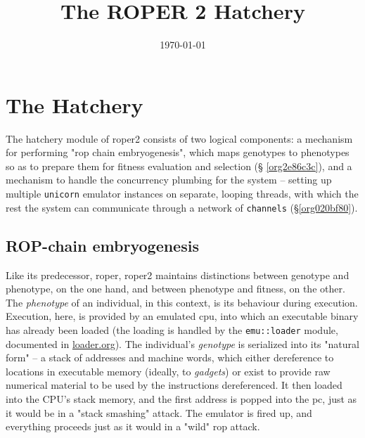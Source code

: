 \documentclass[11pt]{article}
\date{\today}
\title{The ROPER 2 Hatchery}
\begin{document}
\maketitle
\tableofcontents


\section{The Hatchery}
\label{sec:org6961ccb}

The hatchery module of \gls{roper2} consists of two logical components: a
mechanism for performing "\gls{rop} chain embryogenesis", which maps genotypes to
phenotypes so as to prepare them for fitness evaluation and selection (\S
\ref{org2e86c3c}), and a mechanism to handle the concurrency plumbing for the
system -- setting up multiple \texttt{unicorn} emulator instances on separate, looping
threads, with which the rest the system can communicate through a network of
\texttt{channels} (\S \ref{org020bf80}). 

\subsection{ROP-chain embryogenesis}
\label{sec:orgbee2e7b}
\label{org2e86c3c}

Like its predecessor, \gls{roper}, \gls{roper2} maintains distinctions between
genotype and phenotype, on the one hand, and between phenotype and fitness,
on the other. The \emph{phenotype} of an individual, in this context, is its
behaviour during execution. Execution, here, is provided by an emulated
\gls{cpu}, into which an executable binary has already been loaded (the
loading is handled by the \texttt{emu::loader} module, documented in \url{loader.org}).
The individual's \emph{genotype} is serialized into its "natural form" -- a
stack of addresses and machine words, which either dereference to locations
in executable memory (ideally, to \emph{gadgets}) or exist to provide raw numerical
material to be used by the instructions dereferenced. It then loaded into
the CPU's stack memory, and the first address is popped into the \gls{pc}, 
just as it would be in a "stack smashing" attack. The emulator is fired up,
and everything proceeds just as it would in a "wild" \gls{rop} attack.  
\end{document}
